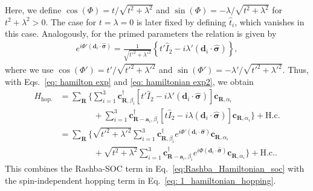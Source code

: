 Here, we define $\cos(\Phi) = t/\sqrt{t^2 + \lambda^2}$ and $\sin(\Phi) = -\lambda/\sqrt{t^2 + \lambda^2}$ for $t^2+\lambda^2 >0$. The case for $t=\lambda=0$ is later fixed by defining $\hat{t}_i$, which vanishes in this case. Analogously, for the primed parameters the relation is given by
\begin{align}
    e^{i\Phi'(\bm{d}_i\cdot \bm{\hat{\sigma}})} = \frac{1}{\sqrt{t'^2 + \lambda'^2}} \left\{t'\hat{I}_2 - i\lambda' (\bm{d}_i \cdot \bm{\hat{\sigma}}) \right\},
    \label{eq: hamiltonian exp2}
\end{align}
where we use $\cos(\Phi') = t'/\sqrt{t'^2 + \lambda'^2}$ and $\sin(\Phi') = -\lambda'/\sqrt{t'^2 + \lambda'^2}$.
Thus, with Eqs.~\eqref{eq: hamilton exp} and \eqref{eq: hamiltonian exp2}, we obtain
\begin{align}
    H_{\text{hop.}}
&=
\sum_{\mathbf R}
\Bigg\{
\sum_{i=1}^{3}
\mathbf{c}_{\mathbf R,\beta_i}^{\dagger}
\left[t'\hat{I}_2 - i\lambda'(\bm{d}_i\!\cdot\!\bm{\hat{\sigma}})\right]
\mathbf{c}_{\mathbf R,\alpha_i}
\nonumber\\
& \qquad\qquad+
\sum_{i=1}^{3}
\mathbf{c}_{\mathbf R-\mathbf a_i,\beta_i}^{\dagger}
\left[t \hat{I}_2 - i\lambda(\bm{d}_i\!\cdot\!\bm{\hat{\sigma}})\right]
\mathbf{c}_{\mathbf R,\alpha_i}
\Bigg\}
+\mathrm{H.c.} \nonumber\\
&= 
\sum_{\mathbf R}
\Bigg\{
\sqrt{t'^2+\lambda'^2}
\sum_{i=1}^{3}
\mathbf{c}_{\mathbf R,\beta_i}^\dagger
e^{i\Phi'(\bm{d}_i\cdot\bm{\hat{\sigma}})}
\mathbf{c}_{\mathbf R,\alpha_i} \nonumber\\
& \qquad\qquad+
\sqrt{t^2+\lambda^2}
\sum_{i=1}^{3}
\mathbf{c}_{\mathbf R-\mathbf a_i,\beta_i}^\dagger
e^{i\Phi(\bm{d}_i\cdot\bm{\hat{\sigma}})}
\mathbf{c}_{\mathbf R,\alpha_i}
\Bigg\}
+\mathrm{H.c.}.
\label{eq: appendix hamiltonian}
\end{align}
This combines the Rashba-SOC term in Eq.~\eqref{eq:Rashba_Hamiltonian_soc} with the spin-independent hopping term in  Eq.~\eqref{eq: 1_hamiltonian_hopping}.